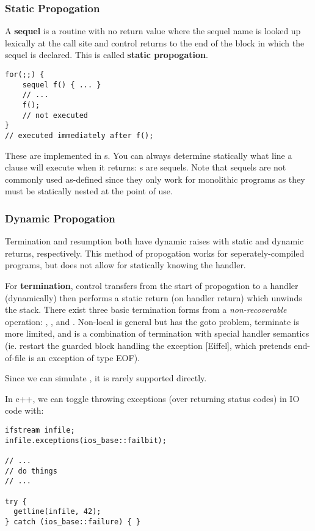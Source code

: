 \documentclass[12pt]{article}
\begin{document}
\subsubsection{Static Propogation}
A {\bf sequel} is a routine with no return value where the sequel name is looked up lexically at the call site and control returns to the end of the block in which the sequel is declared. This is called {\bf static propogation}.

\begin{verbatim}
for(;;) {
    sequel f() { ... }
    // ...
    f();
    // not executed
}
// executed immediately after f();
\end{verbatim}

These are implemented in s. You can always determine statically what line a  clause will execute when it returns: s are sequels. Note that sequels are not commonly used as-defined since they only work for monolithic programs as they must be statically nested at the point of use.

\subsubsection{Dynamic Propogation}
Termination and resumption both have dynamic raises with static and dynamic returns, respectively. This method of propogation works for seperately-compiled programs, but does not allow for statically knowing the handler.

For {\bf termination}, control transfers from the start of propogation to a handler (dynamically) then performs a static return (on handler return) which unwinds the stack. There exist three basic termination forms from a \textit{non-recoverable} operation: , , and . Non-local is general but has the goto problem, terminate is more limited, and  is a combination of termination with special handler semantics (ie. restart the guarded block handling the exception [Eiffel], which pretends end-of-file is an exception of type EOF).

Since we can simulate , it is rarely supported directly.

In c++, we can toggle throwing exceptions (over returning status codes) in IO code with:
\begin{verbatim}
ifstream infile;
infile.exceptions(ios_base::failbit);

// ...
// do things
// ...

try {
  getline(infile, 42);
} catch (ios_base::failure) { }
\end{verbatim}
\end{document}
